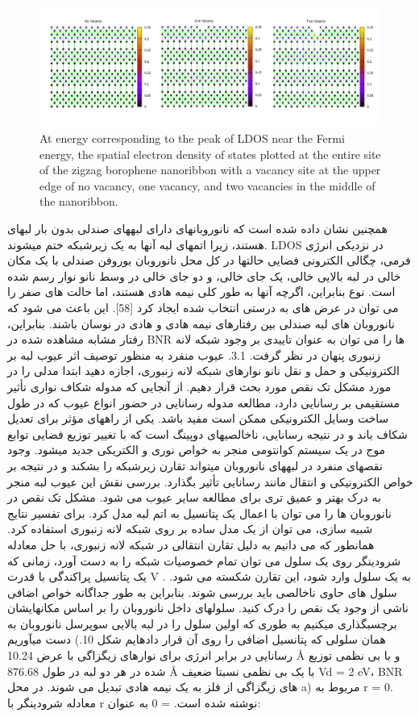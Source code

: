 \begin{figure}[!ht]
    \centering
    \includegraphics[width=1\linewidth]{./figures/Slide4.PNG}
    \caption{At energy corresponding to the peak of LDOS near the Fermi energy, the spatial electron density of states plotted at the entire site of 
    the zigzag borophene nanoribbon with a vacancy site at the upper edge of no vacancy, one vacancy, and two vacancies in the middle of the nanoribbon.}
    \label{zigVSLDOS}
  \end{figure}
همچنین نشان داده شده است که نانوروبانهای دارای لبههای صندلی بدون بار لبهای هستند، زیرا اتمهای لبه آنها به یک زیرشبکه ختم میشوند. LDOS در نزدیکی انرژی فرمی، چگالی الکترونی فضایی حالتها در کل محل نانوروبان بوروفن صندلی با یک مکان خالی در لبه بالایی خالی، یک جای خالی، و دو جای خالی در وسط نانو نوار رسم شده است. نوع بنابراین، اگرچه آنها به طور کلی نیمه هادی هستند، اما حالت های صفر را می توان در عرض های به درستی انتخاب شده ایجاد کرد [58]. این باعث می شود که نانوروبان های لبه صندلی بین رفتارهای نیمه هادی و هادی در نوسان باشند. بنابراین، رفتار مشابه مشاهده شده در BNR ها را می توان به عنوان تاییدی بر وجود شبکه لانه زنبوری پنهان در نظر گرفت. 3.1. عیوب منفرد به منظور توصیف اثر عیوب لبه بر الکترونیکی و حمل و نقل نانو نوارهای شبکه لانه زنبوری، اجازه دهید ابتدا مدلی را در مورد مشکل تک نقص مورد بحث قرار دهیم. از آنجایی که مدوله شکاف نواری تأثیر مستقیمی بر رسانایی دارد، مطالعه مدوله رسانایی در حضور انواع عیوب که در طول ساخت وسایل الکترونیکی ممکن است مفید باشد. یکی از راههای مؤثر برای تعدیل شکاف باند و در نتیجه رسانایی، ناخالصیهای دوپینگ است که با تغییر توزیع فضایی توابع موج در یک سیستم کوانتومی منجر به خواص نوری و الکتریکی جدید میشود. وجود نقصهای منفرد در لبههای نانوروبان میتواند تقارن زیرشبکه را بشکند و در نتیجه بر خواص الکترونیکی و انتقال مانند رسانایی تأثیر بگذارد. بررسی نقش این عیوب لبه منجر به درک بهتر و عمیق تری برای مطالعه سایر عیوب می شود. مشکل تک نقص در نانوروبان ها را می توان با اعمال یک پتانسیل به اتم لبه مدل کرد. برای تفسیر نتایج شبیه سازی، می توان از یک مدل ساده بر روی شبکه لانه زنبوری استفاده کرد. همانطور که می دانیم به دلیل تقارن انتقالی در شبکه لانه زنبوری، با حل معادله شرودینگر روی یک سلول می توان تمام خصوصیات شبکه را به دست آورد، زمانی که یک پتانسیل پراکندگی با قدرت V به یک سلول وارد شود، این تقارن شکسته می شود. . سلول های حاوی ناخالصی باید بررسی شوند. بنابراین به طور جداگانه خواص اضافی ناشی از وجود یک نقص را درک کنید. سلولهای داخل نانوروبان را بر اساس مکانهایشان برچسبگذاری میکنیم به طوری که اولین سلول را در لبه بالایی سوپرسل نانوروبان به دست میآوریم (همان سلولی که پتانسیل اضافی را روی آن قرار دادهایم شکل 10. رسانایی در برابر انرژی برای نوارهای زیگزاگی با عرض 10.24 Å و با بی نظمی توزیع شده در هر دو لبه در طول 876.68 Å با یک بی نظمی نسبتا ضعیف Vd = 2 eV، BNR های زیگزاگی از فلز به یک نیمه هادی تبدیل می شوند. در محل a) مربوط به r = 0. معادله شرودینگر با r نوشته شده است. = 0 به عنوان:
